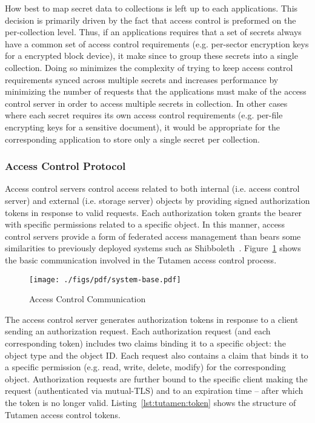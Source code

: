 How best to map secret data to collections is left up to each
applications. This decision is primarily driven by the fact that
access control is preformed on the per-collection level. Thus, if an
applications requires that a set of secrets always have a common set
of access control requirements (e.g. per-sector encryption keys for a
encrypted block device), it make since to group these secrets into a
single collection. Doing so minimizes the complexity of trying to keep
access control requirements synced across multiple secrets and
increases performance by minimizing the number of requests that the
applications must make of the access control server in order to access
multiple secrets in collection. In other cases where each secret
requires its own access control requirements (e.g. per-file encrypting
keys for a sensitive document), it would be appropriate for the
corresponding application to store only a single secret per
collection.

\subsubsection{Access Control Protocol}
\label{sec:tutamen:arch:acp}

Access control servers control access related to both internal
(i.e. access control server) and external (i.e. storage server)
objects by providing signed authorization tokens in response to valid
requests. Each authorization token grants the bearer with specific
permissions related to a specific object. In this manner, access
control servers provide a form of federated access management than
bears some similarities to previously deployed systems such as
Shibboleth~\cite{leandro2012}. Figure~\ref{fig:tutamen:systembase}
shows the basic communication involved in the Tutamen access control
process.

\begin{figure}[th]
  \centering
  \texttt{[image: ./figs/pdf/system-base.pdf]}
  \caption{Access Control Communication}
  \label{fig:tutamen:systembase}
\end{figure}

The access control server generates authorization tokens in response
to a client sending an authorization request. Each authorization
request (and each corresponding token) includes two claims binding it
to a specific object: the object type and the object ID. Each request
also contains a claim that binds it to a specific permission
(e.g. read, write, delete, modify) for the corresponding
object. Authorization requests are further bound to the specific
client making the request (authenticated via mutual-TLS) and to an
expiration time -- after which the token is no longer
valid. Listing~\ref{lst:tutamen:token} shows the structure of Tutamen
access control tokens.

